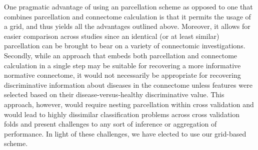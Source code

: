 One pragmatic advantage of using an \apriori parcellation scheme as opposed to one that combines parcellation and connectome calculation is that it permits the usage of a grid, and thus yields all the advantages outlined above. 
Moreover, it allows for easier comparison across studies since an identical (or at least similar) parcellation can be brought to bear on a variety of connectomic investigations. 
Secondly, while an approach that embeds both parcellation and connectome calculation in a single step may be suitable for recovering a more informative normative connectome, it would not necessarily be appropriate for recovering discriminative information about diseases in the connectome unless features were selected based on their disease-versus-healthy discriminative value. 
This approach, however, would require nesting parcellation within cross validation and would lead to highly dissimilar classification problems across cross validation folds and present challenges to any sort of inference or aggregation of performance. 
In light of these challenges, we have elected to use our \apriori grid-based scheme.

